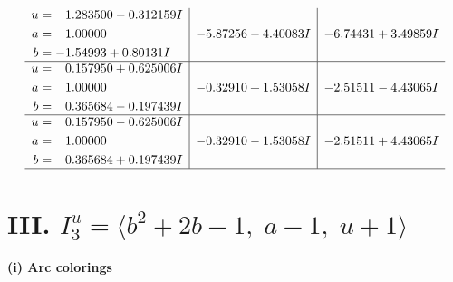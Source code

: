 \documentclass[1p]{elsarticle_modified}
\theoremstyle{definition}
\begin{document}
$$\begin{array}{c|c|c}
\begin{aligned}
u &= \phantom{-}1.283500 - 0.312159 I \\
a &= \phantom{-}1.00000\phantom{ +0.000000I} \\
b &= -1.54993 + 0.80131 I\end{aligned}
 & -5.87256 - 4.40083 I & -6.74431 + 3.49859 I \\ \hline\begin{aligned}
u &= \phantom{-}0.157950 + 0.625006 I \\
a &= \phantom{-}1.00000\phantom{ +0.000000I} \\
b &= \phantom{-}0.365684 - 0.197439 I\end{aligned}
 & -0.32910 + 1.53058 I & -2.51511 - 4.43065 I \\ \hline\begin{aligned}
u &= \phantom{-}0.157950 - 0.625006 I \\
a &= \phantom{-}1.00000\phantom{ +0.000000I} \\
b &= \phantom{-}0.365684 + 0.197439 I\end{aligned}
 & -0.32910 - 1.53058 I & -2.51511 + 4.43065 I\\
 \hline 
 \end{array}$$\newpage\newpage\renewcommand{\arraystretch}{1}
\centering \section*{III. $I^u_{3}= \langle b^2+2 b-1,\;a-1,\;u+1 \rangle$}
\flushleft \textbf{(i) Arc colorings}\\
\end{document}
